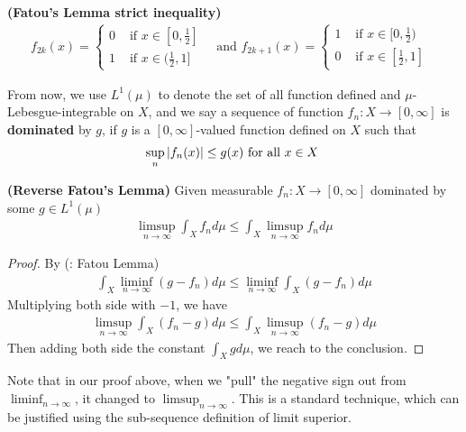 \documentclass{report}
\begin{document}
\begin{Example}{\textbf{(Fatou's Lemma strict inequality)}}{}
\begin{align*}
f_{2k}(x)=\begin{cases}
 0& \text{ if $x\in [0,\frac{1}{2}]$ } \\
 1& \text{ if $x\in (\frac{1}{2},1]$ }
\end{cases}\text{ and }f_{2k+1}(x)=\begin{cases}
  1& \text{ if $x\in [0,\frac{1}{2})$ }\\
  0& \text{ if $x\in [\frac{1}{2},1]$ }
\end{cases}
\end{align*}
\end{Example}
\begin{mdframed}
  From now, we use $L^1(\mu)$ to denote the set of all function defined and $\mu$-Lebesgue-integrable on $X$, and we say a sequence of function  $f_n:X\rightarrow [0,\infty]$ is  \textbf{dominated} by $g$, if $g$ is a $[0,\infty]$-valued function defined on $X$ such that 
\begin{align*}
\sup_n \left|f_n(x)\right| \leq g(x)\text{ for all $x\in X$ }
\end{align*}
\end{mdframed}
\begin{theorem}
\label{RFL}
\textbf{(Reverse Fatou's Lemma)} Given measurable $f_n:X\rightarrow [0,\infty]$ dominated by some $g \in L^1(\mu)$ 
\begin{align*}
\limsup_{n\to\infty} \int_X f_nd\mu \leq \int_X \limsup_{n\to\infty} f_nd\mu
\end{align*}
\end{theorem}
\begin{proof}
By (: Fatou Lemma)
\begin{align*}
\int_X \liminf_{n\to\infty} (g-f_n) d\mu \leq \liminf_{n\to\infty} \int_X (g-f_n)d\mu 
\end{align*}
Multiplying both side with $-1$, we have 
\begin{align*}
\limsup_{n\to\infty} \int_X (f_n-g)d\mu \leq \int_X \limsup_{n\to\infty} (f_n-g)d\mu
\end{align*}
Then adding both side the constant $\int_X gd\mu$, we reach to the conclusion.
\end{proof}
\begin{mdframed}
Note that in our proof above, when we "pull" the negative sign out from $\liminf_{n\to\infty} $, it changed to $\limsup_{n\to\infty} $. This is a standard technique, which can be justified using the sub-sequence definition of limit superior.
\end{mdframed}
\end{document}

